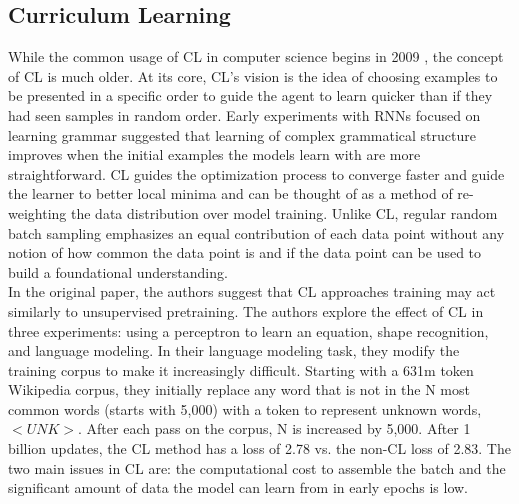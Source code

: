 \subsection{Curriculum Learning}
\label{chap:prior:sec:cl:cl}
While the common usage of CL in computer science begins in 2009 \cite{Bengio2009CurriculumL}, the concept of CL is much older. At its core, CL's vision is the idea of choosing examples to be presented in a specific order to guide the agent to learn quicker than if they had seen samples in random order. Early experiments with RNNs \cite{Elman1993LearningAD} focused on learning grammar suggested that learning of complex grammatical structure improves when the initial examples the models learn with are more straightforward. CL guides the optimization process to converge faster and guide the learner to better local minima and can be thought of as a method of re-weighting the data distribution over model training. Unlike CL, regular random batch sampling emphasizes an equal contribution of each data point without any notion of how common the data point is and if the data point can be used to build a foundational understanding.\\
In the original paper, the authors suggest that CL approaches training may act similarly to unsupervised pretraining. The authors explore the effect of CL in three experiments: using a perceptron to learn an equation, shape recognition, and language modeling. In their language modeling task, they modify the training corpus to make it increasingly difficult. Starting with a 631m token Wikipedia corpus, they initially replace any word that is not in the N most common words (starts with 5,000) with a token to represent unknown words, $<UNK>$. After each pass on the corpus, N is increased by 5,000. After 1 billion updates, the CL method has a loss of 2.78 vs. the non-CL loss of 2.83. The two main issues in CL are: the computational cost to assemble the batch and the significant amount of data the model can learn from in early epochs is low. \\
